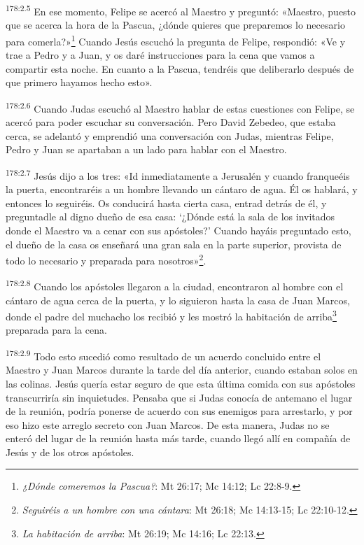 \par
\textsuperscript{178:2.5} En ese momento, Felipe se acercó al Maestro y preguntó: «Maestro, puesto que se acerca la hora de la Pascua, ¿dónde quieres que preparemos lo necesario para comerla?»\footnote{\textit{¿Dónde comeremos la Pascua?}: Mt 26:17; Mc 14:12; Lc 22:8-9.} Cuando Jesús escuchó la pregunta de Felipe, respondió: «Ve y trae a Pedro y a Juan, y os daré instrucciones para la cena que vamos a compartir esta noche. En cuanto a la Pascua, tendréis que deliberarlo después de que primero hayamos hecho esto».

\par
\textsuperscript{178:2.6} Cuando Judas escuchó al Maestro hablar de estas cuestiones con Felipe, se acercó para poder escuchar su conversación. Pero David Zebedeo, que estaba cerca, se adelantó y emprendió una conversación con Judas, mientras Felipe, Pedro y Juan se apartaban a un lado para hablar con el Maestro.

\par
\textsuperscript{178:2.7} Jesús dijo a los tres: «Id inmediatamente a Jerusalén y cuando franqueéis la puerta, encontraréis a un hombre llevando un cántaro de agua. Él os hablará, y entonces lo seguiréis. Os conducirá hasta cierta casa, entrad detrás de él, y preguntadle al digno dueño de esa casa: `¿Dónde está la sala de los invitados donde el Maestro va a cenar con sus apóstoles?' Cuando hayáis preguntado esto, el dueño de la casa os enseñará una gran sala en la parte superior, provista de todo lo necesario y preparada para nosotros»\footnote{\textit{Seguiréis a un hombre con una cántara}: Mt 26:18; Mc 14:13-15; Lc 22:10-12.}.

\par
\textsuperscript{178:2.8} Cuando los apóstoles llegaron a la ciudad, encontraron al hombre con el cántaro de agua cerca de la puerta, y lo siguieron hasta la casa de Juan Marcos, donde el padre del muchacho los recibió y les mostró la habitación de arriba\footnote{\textit{La habitación de arriba}: Mt 26:19; Mc 14:16; Lc 22:13.} preparada para la cena.

\par
\textsuperscript{178:2.9} Todo esto sucedió como resultado de un acuerdo concluido entre el Maestro y Juan Marcos durante la tarde del día anterior, cuando estaban solos en las colinas. Jesús quería estar seguro de que esta última comida con sus apóstoles transcurriría sin inquietudes. Pensaba que si Judas conocía de antemano el lugar de la reunión, podría ponerse de acuerdo con sus enemigos para arrestarlo, y por eso hizo este arreglo secreto con Juan Marcos. De esta manera, Judas no se enteró del lugar de la reunión hasta más tarde, cuando llegó allí en compañía de Jesús y de los otros apóstoles.

